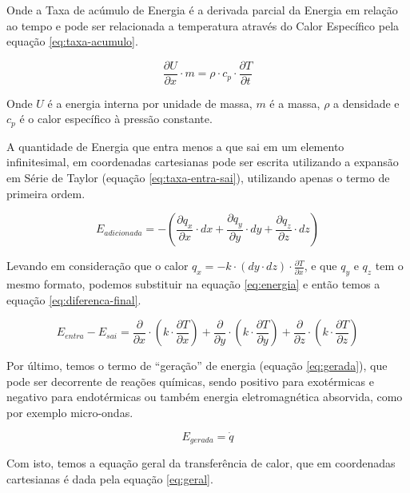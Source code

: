Onde a Taxa de acúmulo de Energia é a derivada parcial da Energia em relação ao tempo e pode ser relacionada a temperatura através do Calor Específico pela equação \ref{eq:taxa-acumulo}.

\begin{equation}\label{eq:taxa-acumulo}
\frac{\partial U}{\partial x} \cdot m = \rho \cdot c_{p} \cdot \frac{\partial T}{\partial t}
\end{equation}

Onde $U$ é a energia interna por unidade de massa, $m$ é a massa, $\rho$ a densidade e $c_p$ é o calor específico à pressão constante.

A quantidade de Energia que entra menos a que sai em um elemento infinitesimal, em coordenadas cartesianas pode ser escrita utilizando a expansão em Série de Taylor (equação \ref{eq:taxa-entra-sai}), utilizando apenas o termo de primeira ordem.

\begin{equation}\label{eq:taxa-entra-sai}
E_{adicionada} = - ( \frac{\partial q_x}{\partial x} \cdot dx + \frac{\partial q_y}{\partial y} \cdot dy + \frac{\partial q_z}{\partial z} \cdot dz )
\end{equation}

Levando em consideração que o calor $q_x = -k \cdot (dy \cdot dz) \cdot \frac{\partial T}{\partial x}$, e que $q_y$ e $q_z$ tem o mesmo formato, podemos substituir na equação \ref{eq:energia} e então temos a equação \ref{eq:diferenca-final}.

\begin{equation}\label{eq:diferenca-final}
E_{entra} - E_{sai} = \frac{\partial}{\partial x} \cdot (k \cdot \frac{\partial T}{\partial x}) + \frac{\partial}{\partial y} \cdot (k \cdot \frac{\partial T}{\partial y}) + \frac{\partial}{\partial z} \cdot (k \cdot \frac{\partial T}{\partial z})
\end{equation}

Por último, temos o termo de “geração” de energia (equação \ref{eq:gerada}), que pode ser decorrente de reações químicas, sendo positivo para exotérmicas e negativo para endotérmicas ou também energia eletromagnética absorvida, como por exemplo micro-ondas. 

\begin{equation}\label{eq:gerada}
E_{gerada} = \dot{q}
\end{equation}

Com isto, temos a equação geral da transferência de calor, que em coordenadas cartesianas é dada pela equação \ref{eq:geral}.

